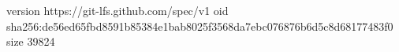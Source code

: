 version https://git-lfs.github.com/spec/v1
oid sha256:de56ed65fbd8591b85384e1bab8025f3568da7ebc076876b6d5c8d68177483f0
size 39824
